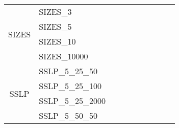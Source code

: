 \begin{table}[]
{\begin{tabular}{|c|l|ll|ll|ll|l|l|}
			\multirow{4}{*}{SIZES}  & SIZES\_3                      &                                   &                                  &                           &                          &                           &                          &                                       &                                \\
			& SIZES\_5                      &                                   &                                  &                           &                          &                           &                          &                                       &                                \\
			& SIZES\_10                     &                                   &                                  &                           &                          &                           &                          &                                       &                                \\
			& SIZES\_10000                  &                                   &                                  &                           &                          &                           &                          &                                       &                                \\ \hline
			\multirow{12}{*}{SSLP}  & SSLP\_5\_25\_50               &                                   &                                  &                           &                          &                           &                          &                                       &                                \\
			& SSLP\_5\_25\_100              &                                   &                                  &                           &                          &                           &                          &                                       &                                \\
			& SSLP\_5\_25\_2000             &                                   &                                  &                           &                          &                           &                          &                                       &                                \\
			& SSLP\_5\_50\_50               &                                   &                                  &                           &                          &                           &                          &                                       &                                \\

\end{tabular}}
\end{table}
